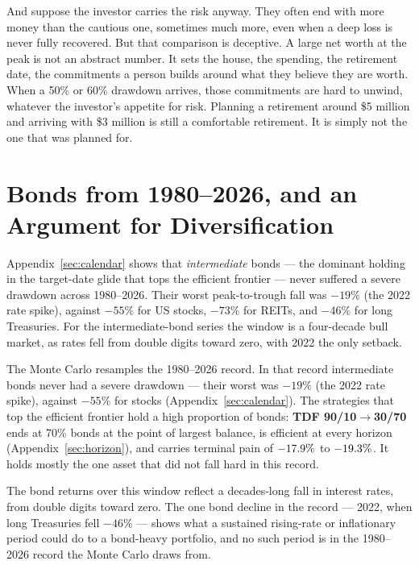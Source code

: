 \documentclass[11pt]{article}
\begin{document}
And suppose the investor carries the risk anyway. They often end with more money than the cautious one,
sometimes much more, even when a deep loss is never fully recovered. But that comparison is deceptive. A
large net worth at the peak is not an abstract number. It sets the house, the spending, the retirement
date, the commitments a person builds around what they believe they are worth. When a 50\% or 60\%
drawdown arrives, those commitments are hard to unwind, whatever the investor's appetite for risk.
Planning a retirement around \$5 million and arriving with \$3 million is still a comfortable retirement.
It is simply not the one that was planned for.

\section{Bonds from 1980--2026, and an Argument for Diversification}\label{sec:bonds}

Appendix~\ref{sec:calendar} shows that \emph{intermediate} bonds --- the dominant holding in the
target-date glide that tops the efficient frontier --- never suffered a severe drawdown across 1980--2026. Their
worst peak-to-trough fall was $-19\%$ (the 2022 rate spike), against $-55\%$ for US stocks, $-73\%$ for
REITs, and $-46\%$ for long Treasuries. For the intermediate-bond series the window is a four-decade bull
market, as rates fell from double digits toward zero, with 2022 the only setback.

The Monte Carlo resamples the 1980--2026 record. In that record intermediate bonds never had a severe
drawdown --- their worst was $-19\%$ (the 2022 rate spike), against $-55\%$ for stocks
(Appendix~\ref{sec:calendar}). The strategies that top the efficient frontier hold a high proportion of
bonds: \textbf{TDF 90/10$\to$30/70} ends at 70\% bonds at the point of largest balance, is efficient at
every horizon (Appendix~\ref{sec:horizon}), and carries terminal pain of $-17.9\%$ to $-19.3\%$. It holds
mostly the one asset that did not fall hard in this record.

The bond returns over this window reflect a decades-long fall in interest rates, from double digits
toward zero. The one bond decline in the record --- 2022, when long Treasuries fell $-46\%$ --- shows
what a sustained rising-rate or inflationary period could do to a bond-heavy portfolio, and no such
period is in the 1980--2026 record the Monte Carlo draws from.
\end{document}
